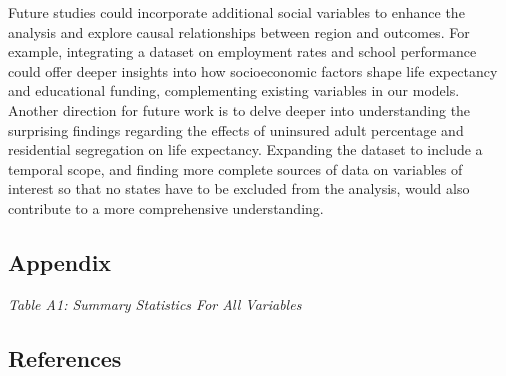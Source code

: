 \documentclass[
  10pt,
  letterpaper,
  DIV=11,
  numbers=noendperiod]{scrartcl}
\begin{document}
Future studies could incorporate additional social variables to enhance
the analysis and explore causal relationships between region and
outcomes. For example, integrating a dataset on employment rates and
school performance could offer deeper insights into how socioeconomic
factors shape life expectancy and educational funding, complementing
existing variables in our models. Another direction for future work is
to delve deeper into understanding the surprising findings regarding the
effects of uninsured adult percentage and residential segregation on
life expectancy. Expanding the dataset to include a temporal scope, and
finding more complete sources of data on variables of interest so that
no states have to be excluded from the analysis, would also contribute
to a more comprehensive understanding.

\subsection{\texorpdfstring{\textbf{Appendix}}{Appendix}}\label{appendix}

\emph{Table A1: Summary Statistics For All Variables}

\subsection{\texorpdfstring{\textbf{References}}{References}}\label{references}
\end{document}
